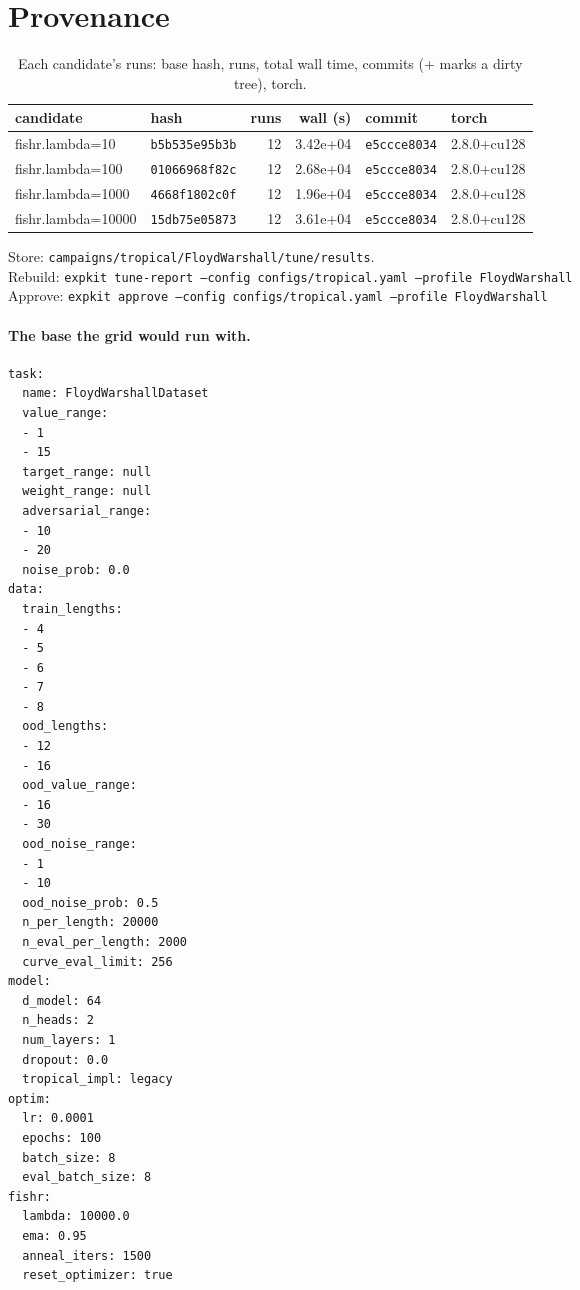 \documentclass[10pt]{article}
\begin{document}
\section{Provenance}
{\small
\begin{longtable}{llrrll}
\caption{Each candidate's runs: base hash, runs, total wall time, commits (+ marks a dirty tree), torch.}\label{tab:provenance}\\
\toprule
candidate & hash & runs & wall (s) & commit & torch\\
\midrule
\endhead
fishr.lambda=10 & \texttt{b5b535e95b3b} & 12 & 3.42e+04 & \texttt{e5ccce8034} & 2.8.0+cu128\\
fishr.lambda=100 & \texttt{01066968f82c} & 12 & 2.68e+04 & \texttt{e5ccce8034} & 2.8.0+cu128\\
fishr.lambda=1000 & \texttt{4668f1802c0f} & 12 & 1.96e+04 & \texttt{e5ccce8034} & 2.8.0+cu128\\
fishr.lambda=10000 & \texttt{15db75e05873} & 12 & 3.61e+04 & \texttt{e5ccce8034} & 2.8.0+cu128\\
\bottomrule
\end{longtable}
}
\noindent Store: \texttt{campaigns/tropical/FloydWarshall/tune/results}.\\
Rebuild: \texttt{expkit tune-report --config configs/tropical.yaml --profile FloydWarshall}\\
Approve: \texttt{expkit approve --config configs/tropical.yaml --profile FloydWarshall}

\paragraph{The base the grid would run with.}
{\footnotesize
\begin{verbatim}
task:
  name: FloydWarshallDataset
  value_range:
  - 1
  - 15
  target_range: null
  weight_range: null
  adversarial_range:
  - 10
  - 20
  noise_prob: 0.0
data:
  train_lengths:
  - 4
  - 5
  - 6
  - 7
  - 8
  ood_lengths:
  - 12
  - 16
  ood_value_range:
  - 16
  - 30
  ood_noise_range:
  - 1
  - 10
  ood_noise_prob: 0.5
  n_per_length: 20000
  n_eval_per_length: 2000
  curve_eval_limit: 256
model:
  d_model: 64
  n_heads: 2
  num_layers: 1
  dropout: 0.0
  tropical_impl: legacy
optim:
  lr: 0.0001
  epochs: 100
  batch_size: 8
  eval_batch_size: 8
fishr:
  lambda: 10000.0
  ema: 0.95
  anneal_iters: 1500
  reset_optimizer: true
\end{verbatim}
}

\clearpage
\appendix
\end{document}

